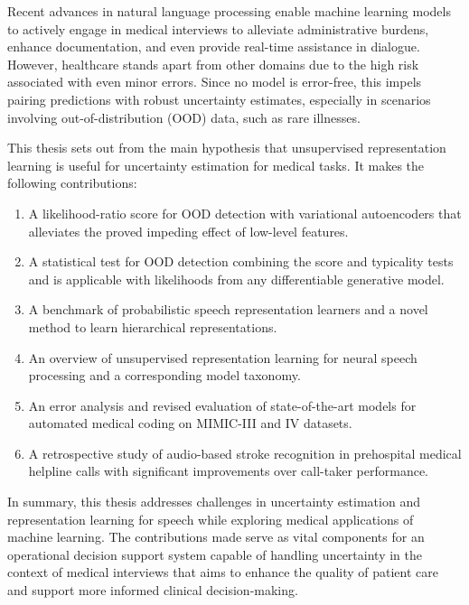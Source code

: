 Recent advances in natural language processing enable machine learning models to actively engage in medical interviews to alleviate administrative burdens, enhance documentation, and even provide real-time assistance in dialogue. 
However, healthcare stands apart from other domains due to the high risk associated with even minor errors. Since no model is error-free, this impels pairing predictions with robust uncertainty estimates, especially in scenarios involving out-of-distribution (OOD) data, such as rare illnesses. 

This thesis sets out from the main hypothesis that unsupervised representation learning is useful for uncertainty estimation for medical tasks. 
It makes the following contributions:
%
\begin{enumerate}[topsep=3pt, partopsep=0pt, itemsep=3pt, parsep=0pt, leftmargin=2em, label=(\alph*)] %
    \item A likelihood-ratio score for OOD detection with variational autoencoders that alleviates the proved impeding effect of low-level features.
    \item A statistical test for OOD detection combining the score and typicality tests and is applicable with likelihoods from any differentiable generative model.
    \item A benchmark of probabilistic speech representation learners and a novel method to learn hierarchical representations.
    \item An overview of unsupervised representation learning for neural speech processing and a corresponding model taxonomy.
    \item An error analysis and revised evaluation of state-of-the-art models for automated medical coding on MIMIC-III and IV datasets. 
    \item A retrospective study of audio-based stroke recognition in prehospital medical helpline calls with significant improvements over call-taker performance.
\end{enumerate}
%
In summary, this thesis addresses challenges in uncertainty estimation and representation learning for speech while exploring medical applications of machine learning.
The contributions made serve as vital components for an operational decision support system capable of handling uncertainty in the context of medical interviews that aims to enhance the quality of patient care and support more informed clinical decision-making.



